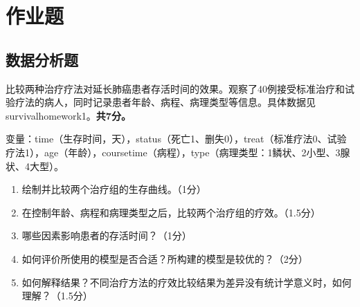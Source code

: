 
\label{chapter:3}

\par\addvspace{8pt}\noindent\begin{minipage}{\linewidth}

\section{作业题}

\subsection{数据分析题}


比较两种治疗疗法对延长肺癌患者存活时间的效果。观察了40例接受标准治疗和试验疗法的病人，同时记录患者年龄、病程、病理类型等信息。具体数据见 survivalhomework1。\textbf{共7分。}

变量：time（生存时间，天），status（死亡1、删失0），treat（标准疗法0、试验疗法1），age（年龄），coursetime（病程），type（病理类型：1鳞状、2小型、3腺状、4大型）。

\begin{enumerate}
\def\labelenumi{\arabic{enumi}.}
\tightlist
\item
  绘制并比较两个治疗组的生存曲线。（1分）
\item
  在控制年龄、病程和病理类型之后，比较两个治疗组的疗效。（1.5分）
\item
  哪些因素影响患者的存活时间？（1分）
\item
  如何评价所使用的模型是否合适？所构建的模型是较优的？（2分）
\item
  如何解释结果？不同治疗方法的疗效比较结果为差异没有统计学意义时，如何理解？（1.5分）
\end{enumerate}



\end{minipage}\par\vspace{5pt}

